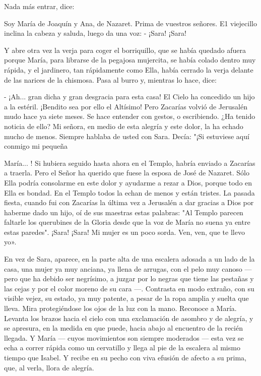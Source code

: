 \documentclass[12pt, twoside, openright]{book} %
\begin{document}
Nada más entrar, dice: 

Soy María de Joaquín y Ana, de Nazaret. Prima de vuestros señores. E1 viejecillo inclina la cabeza y saluda, luego da una voz: - ¡Sara! ¡Sara! 

Y abre otra vez la verja para coger el borriquillo, que se había quedado afuera porque María, para librarse de la pegajosa mujercita, se había colado dentro muy rápida, y el jardinero, tan rápidamente como Ella, había cerrado la verja delante de las narices de la chismosa. Pasa al burro y, mientras lo hace, dice: 

- ¡Ah... gran dicha y gran desgracia para esta casa! El Cielo ha concedido un hijo a la estéril. ¡Bendito sea por ello el Altísimo! Pero Zacarías volvió de Jerusalén mudo hace ya siete meses. Se hace entender con gestos, o escribiendo. ¿Ha tenido noticia de ello? Mi señora, en medio de esta alegría y este dolor, la ha echado mucho de menos. Siempre hablaba de usted con Sara. Decía: "¡Si estuviese aquí conmigo mi pequeña 

María... ! Si hubiera seguido hasta ahora en el Templo, habría enviado a Zacarías a traerla. Pero el Señor ha querido que fuese la esposa de José de Nazaret. Sólo Ella podría consolarme en este dolor y ayudarme a rezar a Dios, porque todo en Ella es bondad. En el Templo todos la echan de menos y están tristes. La pasada fiesta, cuando fui con Zacarías la última vez a Jerusalén a dar gracias a Dios por haberme dado un hijo, oí de sus maestras estas palabras: "Al Templo parecen faltarle los querubines de la Gloria desde que la voz de María no suena ya entre estas paredes". ¡Sara! ¡Sara! Mi mujer es un poco sorda. Ven, ven, que te llevo yo». 

En vez de Sara, aparece, en la parte alta de una escalera adosada a un lado de la casa, una mujer ya muy anciana, ya llena de arrugas, con el pelo muy canoso — pero que ha debido ser negrísimo, a juzgar por lo negras que tiene las pestañas y las cejas y por el color moreno de su cara —. Contrasta en modo extraño, con su visible vejez, su estado, ya muy patente, a pesar de la ropa amplia y suelta que lleva. Mira protegiéndose los ojos de la luz con la mano. Reconoce a María. Levanta los brazos hacia el cielo con una exclamación de asombro y de alegría, y se apresura, en la medida en que puede, hacia abajo al encuentro de la recién llegada. Y María — cuyos movimientos son siempre moderados — esta vez se echa a correr rápida como un cervatillo y llega al pie de la escalera al mismo tiempo que Isabel. Y recibe en su pecho con viva efusión de afecto a su prima, que, al verla, llora de alegría. 
\end{document}
